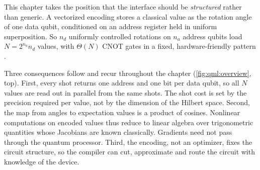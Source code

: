 This chapter takes the position that the interface should be \emph{structured} rather than generic. A vectorized encoding stores a classical value as the rotation angle of one data qubit, conditioned on an address register held in uniform superposition. So $n_d$ uniformly controlled rotations on $n_a$ address qubits load $N = 2^{n_a} n_d$ values, with $\Theta(N)$ CNOT gates in a fixed, hardware-friendly pattern \cite{mottonen2004ucr,balewski2024qcrank}.

Three consequences follow and recur throughout the chapter (\cref{fig:qml:overview}, top). First, every shot returns one address and one bit per data qubit, so all $N$ values are read out in parallel from the same shots. The shot cost is set by the precision required per value, not by the dimension of the Hilbert space. Second, the map from angles to expectation values is a product of cosines. Nonlinear computations on encoded values thus reduce to linear algebra over trigonometric quantities whose Jacobians are known classically. Gradients need not pass through the quantum processor. Third, the encoding, not an optimizer, fixes the circuit structure, so the compiler can cut, approximate and route the circuit with knowledge of the device.

